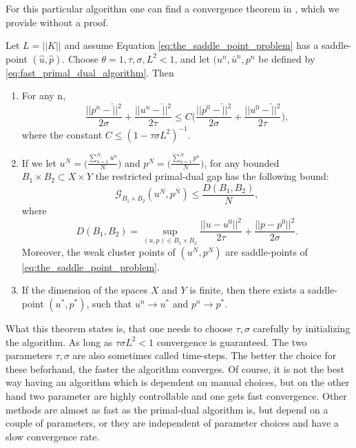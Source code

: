     For this particular algorithm one can find a convergence theorem in \cite{Chambolle10afirst-order}, which we provide without a proof.

    \begin{theorem} %
    \label{the:primal_dual_convergence}
        Let $L = ||K||$ and assume Equation \ref{eq:the_saddle_point_problem} has a saddle-point $(\hat{u}, \hat{p})$. Choose $\theta = 1, \tau, \sigma, L^{2} < 1$, and let $(u^{n}, \bar{u}^{n}, p^{n}$ be defined by \ref{eq:fast_primal_dual_algorithm}. Then
            \begin{enumerate}
                \item For any n,
                    $$
                        \frac{||p^{n} - \hat||^{2}}{2\sigma} + \frac{||u^{n} - \hat||^{2}}{2\tau} \le C \bigg( \frac{||p^{0} - \hat||^{2}}{2\sigma} + \frac{||u^{0} - \hat||^{2}}{2\tau} \bigg),
                    $$
                where the constant $C \le (1 - \tau\sigma L^{2})^{-1}$.
                \item If we let $u^{N} = \bigg( \frac{\sum\limits_{n=1}^{N} u^{n}}{N} \bigg)$ and $p^{N} = \bigg( \frac{\sum\limits_{n=1}^{N} p^{n}}{N} \bigg)$, for any bounded $B_{1} \times B_{2} \subset X \times Y$ the restricted primal-dual gap has the following bound:
                    $$
                        \mathcal{G}_{B_{1} \times B_{2}}(u^{N}, p^{N}) \le \frac{D(B_{1}, B_{2})}{N},
                    $$
                where
                    $$
                        D(B_{1}, B_{2}) = \sup_{(u, p) \in B_{1} \times B_{2}} \frac{||u - u^{0}||^{2}}{2\tau} + \frac{||p - p^{0}||^{2}}{2\sigma}.
                    $$
                Moreover, the weak cluster points of $(u^{N}, p^{N})$ are saddle-points of \ref{eq:the_saddle_point_problem}.
                \item If the dimension of the spaces $X$ and $Y$ is finite, then there exists a saddle-point $(u^{\ast}, p^{\ast})$, such that $u^{n} \longrightarrow u^{\ast}$ and $p^{n} \longrightarrow p^{\ast}$.
            \end{enumerate}
    \end{theorem}

    \begin{remark}
        What this theorem states is, that one needs to choose $\tau, \sigma$ carefully by initializing the algorithm. As long as $\tau\sigma L^{2} < 1$ convergence is guaranteed. The two parameters $\tau, \sigma$ are also sometimes called time-steps. The better the choice for these beforhand, the faster the algorithm converges. Of course, it is not the best way having an algorithm which is dependent on manual choices, but on the other hand two parameter are highly controllable and one gets fast convergence. Other methods are almost as fast as the primal-dual algorithm is, but depend on a couple of parameters, or they are independent of parameter choices and have a slow convergence rate.
    \end{remark}


